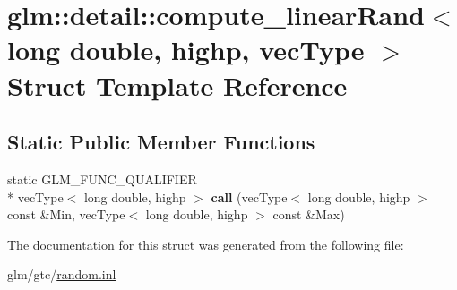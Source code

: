 \hypertarget{structglm_1_1detail_1_1compute__linearRand_3_01long_01double_00_01highp_00_01vecType_01_4}{\section{glm\-:\-:detail\-:\-:compute\-\_\-linear\-Rand$<$ long double, highp, vec\-Type $>$ Struct Template Reference}
\label{structglm_1_1detail_1_1compute__linearRand_3_01long_01double_00_01highp_00_01vecType_01_4}
}
\subsection*{Static Public Member Functions}
\begin{DoxyCompactItemize}
\item 
\hypertarget{structglm_1_1detail_1_1compute__linearRand_3_01long_01double_00_01highp_00_01vecType_01_4_ace5ddc612cfa5043fad6b875fdb86553}{static G\-L\-M\-\_\-\-F\-U\-N\-C\-\_\-\-Q\-U\-A\-L\-I\-F\-I\-E\-R \\*
vec\-Type$<$ long double, highp $>$ {\bfseries call} (vec\-Type$<$ long double, highp $>$ const \&Min, vec\-Type$<$ long double, highp $>$ const \&Max)}\label{structglm_1_1detail_1_1compute__linearRand_3_01long_01double_00_01highp_00_01vecType_01_4_ace5ddc612cfa5043fad6b875fdb86553}

\end{DoxyCompactItemize}


The documentation for this struct was generated from the following file\-:\begin{DoxyCompactItemize}
\item 
glm/gtc/\hyperlink{random_8inl}{random.\-inl}\end{DoxyCompactItemize}
